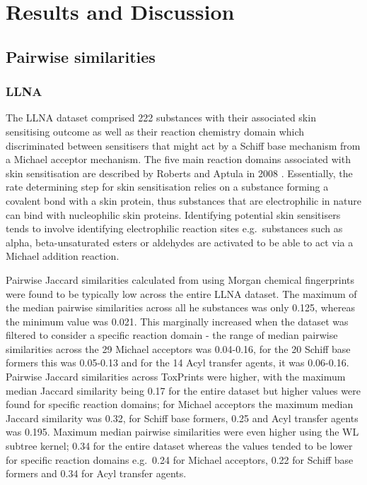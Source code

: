 \documentclass[
  super,
  preprint,
  3p]{elsarticle}
\begin{document}
\section{Results and Discussion}\label{results-and-discussion}

\subsection{Pairwise similarities}\label{pairwise-similarities}

\subsubsection{LLNA}\label{sec-llna}

The LLNA dataset comprised 222 substances with their associated skin
sensitising outcome as well as their reaction chemistry domain which
discriminated between sensitisers that might act by a Schiff base
mechanism from a Michael acceptor mechanism. The five main reaction
domains associated with skin sensitisation are described by Roberts and
Aptula in 2008 \citep{roberts_determinants_2008}. Essentially, the rate
determining step for skin sensitisation relies on a substance forming a
covalent bond with a skin protein, thus substances that are
electrophilic in nature can bind with nucleophilic skin proteins.
Identifying potential skin sensitisers tends to involve identifying
electrophilic reaction sites e.g.~substances such as alpha,
beta-unsaturated esters or aldehydes are activated to be able to act via
a Michael addition reaction.

Pairwise Jaccard similarities calculated from using Morgan chemical
fingerprints were found to be typically low across the entire LLNA
dataset. The maximum of the median pairwise similarities across all he
substances was only 0.125, whereas the minimum value was 0.021. This
marginally increased when the dataset was filtered to consider a
specific reaction domain - the range of median pairwise similarities
across the 29 Michael acceptors was 0.04-0.16, for the 20 Schiff base
formers this was 0.05-0.13 and for the 14 Acyl transfer agents, it was
0.06-0.16. Pairwise Jaccard similarities across ToxPrints were higher,
with the maximum median Jaccard similarity being 0.17 for the entire
dataset but higher values were found for specific reaction domains; for
Michael acceptors the maximum median Jaccard similarity was 0.32, for
Schiff base formers, 0.25 and Acyl transfer agents was 0.195. Maximum
median pairwise similarities were even higher using the WL subtree
kernel; 0.34 for the entire dataset whereas the values tended to be
lower for specific reaction domains e.g.~0.24 for Michael acceptors,
0.22 for Schiff base formers and 0.34 for Acyl transfer agents.
\end{document}
